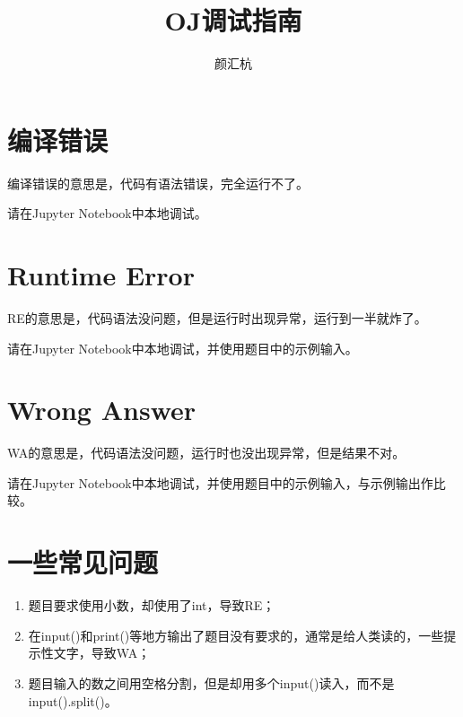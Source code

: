 \documentclass[twocolumn, a5paper]{article}
\title{OJ调试指南}
\author{颜汇杭}
\begin{document}
\maketitle	
\thispagestyle{empty}

\section{编译错误}

编译错误的意思是，代码有语法错误，完全运行不了。

请在Jupyter Notebook中本地调试。

\section{Runtime Error}

RE的意思是，代码语法没问题，但是运行时出现异常，运行到一半就炸了。

请在Jupyter Notebook中本地调试，并使用题目中的示例输入。

\section{Wrong Answer}

WA的意思是，代码语法没问题，运行时也没出现异常，但是结果不对。

请在Jupyter
Notebook中本地调试，并使用题目中的示例输入，与示例输出作比较。

\section{一些常见问题}

\begin{enumerate}
	\item 题目要求使用小数，却使用了int，导致RE；
	\item 在input()和print()等地方输出了题目没有要求的，通常是给人类读的，一些提示性文字，导致WA；
	\item
			题目输入的数之间用空格分割，但是却用多个input()读入，而不是input().split()。
\end{enumerate}
\end{document}
